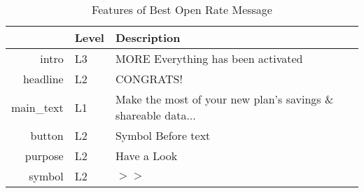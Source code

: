 \begin{table}[ht]
\centering
\caption{Features of Best Open Rate Message} 
\label{tab:best_open}
\begin{tabular}{rll}
  \hline
 & Level & Description \\ 
  \hline
intro & L3 & MORE Everything has been activated \\ 
  headline & L2 & CONGRATS! \\ 
  main\_text & L1 & Make the most of your new plan’s savings \& shareable data... \\ 
  button & L2 & Symbol Before text \\ 
  purpose & L2 & Have a Look \\ 
  symbol & L2 & $>>$ \\ 
   \hline
\end{tabular}
\end{table}
